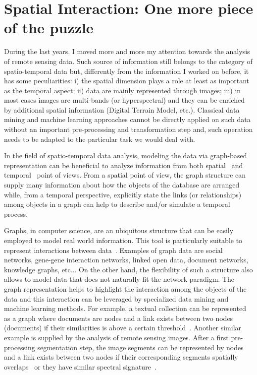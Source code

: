\section{Spatial Interaction: One more piece of the puzzle}

During the last years, I moved more and more my attention towards the analysis of remote sensing data. Such source of information still belongs to the category of spatio-temporal data but, differently from the information I worked on before, it has some peculiarities: i) the spatial dimension plays a role at least as important as the temporal aspect; ii) data are mainly represented through images; iii) in most cases images are multi-bands (or hyperspectral) and they can be enriched by additional spatial information (Digital Terrain Model, etc.). 
Classical data mining and machine learning approaches cannot be directly applied on such data without an important pre-processing and transformation step and, such operation needs to be adapted to the particular task we would deal with. 

In the field of spatio-temporal data analysis, modeling the data via graph-based representation can be beneficial to analyze information from both spatial~\cite{TuiaMGM13} and temporal~\cite{BringmannBBG10} point of views. From a spatial point of view, the graph structure can supply many information about how the objects of the database are arranged while, from a temporal perspective, explicitly state the links (or relationships) among objects in a graph can help to describe and/or simulate a temporal process.

Graphs, in computer science, are an ubiquitous structure that can be easily employed to model real world information. This tool is particularly suitable to represent interactions between data~\cite{Aggarwal:2010:MMG:1738952}. Examples of graph data are social networks, gene-gene interaction networks, linked open data, document networks, knowledge graphs, etc...
On the other hand, the flexibility of such a structure also allows to model data that does not naturally fit the network paradigm. The graph representation helps to highlight the interaction among the objects of the data and this interaction can be leveraged by specialized data mining and machine learning methods. For example, a textual collection can be represented as a graph where documents are nodes and a link exists between two nodes (documents) if their similarities is above a certain threshold~\cite{RomeoIT15}. Another similar example is supplied by the analysis of remote sensing images. 
After a first pre-processing segmentation step, the image segments can be represented by nodes and a link exists between two nodes if their corresponding segments spatially overlaps~\cite{GuttlerACINPT14} or they have similar spectral signature~\cite{Guttler16}.



